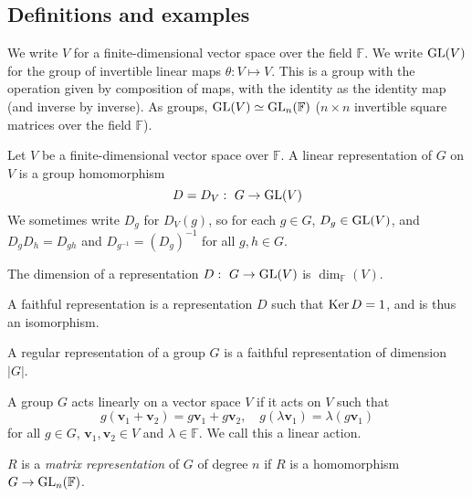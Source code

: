 \documentclass[a4paper]{article}
\begin{document}
\subsection{Definitions and examples}
\begin{notation}
  We write $V$ for a finite-dimensional vector space over the field $\mathbb{F}$. We write $\operatorname{GL}(V)$ for the group of invertible linear maps $\theta: V \mapsto V$. This is a group with the operation given by composition of maps, with the identity as the identity map (and inverse by inverse). As groups, $\operatorname{GL}(V)\simeq\operatorname{GL}_n(\mathbb{F})$ ($n\times n$ invertible square matrices over the field $\mathbb{F}$).
\end{notation}
\begin{defi}[Representation]
  Let $V$ be a finite-dimensional vector space over $\mathbb{F}$. A linear representation of $G$ on $V$ is a group homomorphism
$$D = D_V:~G \to \operatorname{GL}(V)$$
  We sometimes write $D_g$ for $D_V(g)$, so for each $g \in G$, $D_g \in \operatorname{GL}(V)$, and $D_g D_h = D_{gh}$ and $D_{g^{-1}} = (D_g)^{-1}$ for all $g, h \in G$.
\end{defi}
\begin{defi}
  The dimension of a representation $D:~G \rightarrow \operatorname{GL}(V)$ is $\dim_{\mathbb{F}}(V)$.
\end{defi}
\begin{defi}
  A faithful representation is a representation $D$ such that $\operatorname{Ker} D = 1$, and is thus an isomorphism.
\end{defi}
\begin{defi}
 A regular representation of a group $G$ is a faithful representation of dimension $|G|$.
\end{defi}
\begin{defi}
  A group $G$ acts linearly on a vector space $V$ if it acts on $V$ such that
$$g(\mathbf{v}_1 + \mathbf{v}_2) = g \mathbf{v}_1 + g \mathbf{v}_2,\quad g(\lambda \mathbf{v}_1) = \lambda (g\mathbf{v}_1)$$
  for all $g \in G$, $\mathbf{v}_1, \mathbf{v}_2 \in V$ and $\lambda \in\mathbb{F}$. We call this a linear action.
\end{defi}
\begin{defi}
  $R$ is a \emph{matrix representation} of $G$ of degree $n$ if $R$ is a homomorphism $G \to \operatorname{GL}_n(\mathbb{F})$.
\end{defi}
\end{document}
